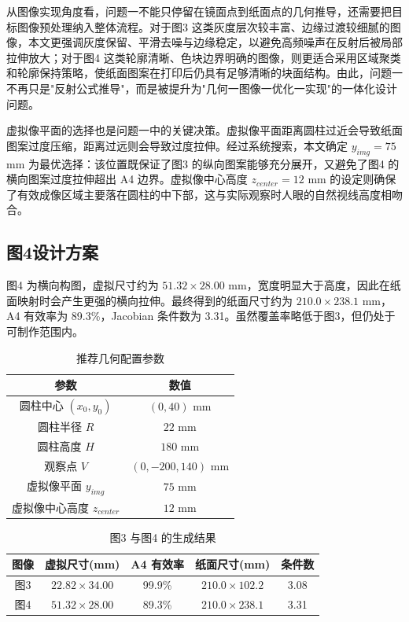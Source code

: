 \documentclass[a4paper,12pt]{ctexart}
\begin{document}
\par 从图像实现角度看，问题一不能只停留在镜面点到纸面点的几何推导，还需要把目标图像预处理纳入整体流程。对于图3 这类灰度层次较丰富、边缘过渡较细腻的图像，本文更强调灰度保留、平滑去噪与边缘稳定，以避免高频噪声在反射后被局部拉伸放大；对于图4 这类轮廓清晰、色块边界明确的图像，则更适合采用区域聚类和轮廓保持策略，使纸面图案在打印后仍具有足够清晰的块面结构。由此，问题一不再只是"反射公式推导"，而是被提升为"几何一图像一优化一实现"的一体化设计问题。

\par 虚拟像平面的选择也是问题一中的关键决策。虚拟像平面距离圆柱过近会导致纸面图案过度压缩，距离过远则会导致过度拉伸。经过系统搜索，本文确定 $y_{img}=75$ mm 为最优选择：该位置既保证了图3 的纵向图案能够充分展开，又避免了图4 的横向图案过度拉伸超出 A4 边界。虚拟像中心高度 $z_{center}=12$ mm 的设定则确保了有效成像区域主要落在圆柱的中下部，这与实际观察时人眼的自然视线高度相吻合。

\subsection{图4设计方案}
\par 图4 为横向构图，虚拟尺寸约为 $51.32\times28.00$ mm，宽度明显大于高度，因此在纸面映射时会产生更强的横向拉伸。最终得到的纸面尺寸约为 $210.0\times238.1$ mm，A4 有效率为 89.3\%，Jacobian 条件数为 3.31。虽然覆盖率略低于图3，但仍处于可制作范围内。

\begin{table}[H]
\centering
\caption{推荐几何配置参数}
\label{tab:geometry}
\begin{tabular}{cc}
\toprule[1.5pt]
\textbf{参数} & \textbf{数值} \\
\midrule[1pt]
圆柱中心 $(x_0,y_0)$ & $(0,40)$ mm \\
圆柱半径 $R$ & $22$ mm \\
圆柱高度 $H$ & $180$ mm \\
观察点 $V$ & $(0,-200,140)$ mm \\
虚拟像平面 $y_{img}$ & $75$ mm \\
虚拟像中心高度 $z_{center}$ & $12$ mm \\
\bottomrule[1.5pt]
\end{tabular}
\end{table}

\begin{table}[H]
\centering
\caption{图3 与图4 的生成结果}
\label{tab:results}
\begin{tabular}{ccccc}
\toprule[1.5pt]
\textbf{图像} & \textbf{虚拟尺寸(mm)} & \textbf{A4 有效率} & \textbf{纸面尺寸(mm)} & \textbf{条件数} \\
\midrule[1pt]
图3 & $22.82\times34.00$ & 99.9\% & $210.0\times102.2$ & 3.08 \\
图4 & $51.32\times28.00$ & 89.3\% & $210.0\times238.1$ & 3.31 \\
\bottomrule[1.5pt]
\end{tabular}
\end{table}
\end{document}
